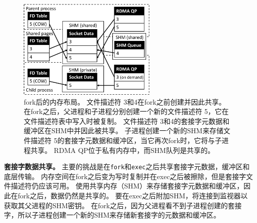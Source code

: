 \begin{figure}[htbp]
	\centering
	\includegraphics[width=0.6\textwidth]{images/fork_memory}
	
	\caption{fork后的内存布局。 文件描述符 3和4在fork之前创建并因此共享。 在fork之后，父进程和子进程分别创建一个新的文件描述符 5，它在文件描述符表中写入时被复制。 文件描述符 3和4的套接字元数据和缓冲区在SHM中并因此被共享。 子进程创建一个新的SHM来存储文件描述符 5的套接字元数据和缓冲区，当它再次fork时，它将与子进程共享。 RDMA QP位于私有内存中，而SHM队列是共享的。}
	\label{socksdirect:fig:fork-memory}
\end{figure}
\textbf {套接字数据共享。}
主要的挑战是在\texttt {fork}和\texttt {exec}之后共享套接字元数据，缓冲区和底层传输。
内存空间在fork之后变为写时复制并在exec之后被擦除，但是套接字文件描述符仍应该可用。
\sys{} 使用共享内存（SHM）来存储套接字元数据和缓冲区，因此在fork之后，数据仍然是共享的。
要在exec之后附加SHM，\libipc {}将连接到监视器以获取其父进程的SHM密钥。
在fork之后，因为父进程看不到子进程创建的套接字，所以子进程创建一个新的SHM来存储新套接字的元数据和缓冲区。

